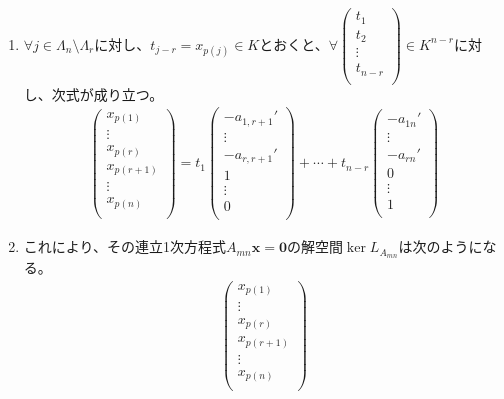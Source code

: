 \documentclass[dvipdfmx]{jsarticle}
\begin{document}
\begin{thm*}
\begin{enumerate}
    \item
      $\forall j \in \varLambda_{n} \setminus \varLambda_{r}$に対し、$t_{j - r} = x_{p(j)} \in K$とおくと、$\forall\begin{pmatrix}
      t_{1} \\
      t_{2} \\
       \vdots \\
      t_{n - r} \\
      \end{pmatrix} \in K^{n - r}$に対し、次式が成り立つ。
    \begin{align*}
    \begin{pmatrix}
    x_{p(1)} \\
     \vdots \\
    x_{p(r)} \\
    x_{p(r + 1)} \\
     \vdots \\
    x_{p(n)} \\
    \end{pmatrix} = t_{1}\begin{pmatrix}
     - a_{1,r + 1}' \\
     \vdots \\
     - a_{r,r + 1}' \\
    1 \\
     \vdots \\
    0 \\
    \end{pmatrix} + \cdots + t_{n - r}\begin{pmatrix}
     - a_{1n}' \\
     \vdots \\
     - a_{rn}' \\
    0 \\
     \vdots \\
    1 \\
    \end{pmatrix}
    \end{align*}
    \item
      これにより、その連立1次方程式$A_{mn}\mathbf{x} = \mathbf{0}$の解空間$\ker L_{A_{mn}}$は次のようになる。
    \begin{align*}
    \begin{pmatrix}
    x_{p(1)} \\
     \vdots \\
    x_{p(r)} \\
    x_{p(r + 1)} \\
     \vdots \\
    x_{p(n)} \\

\end{pmatrix}
\end{align*}
\end{enumerate}
\end{thm*}
\end{document}
